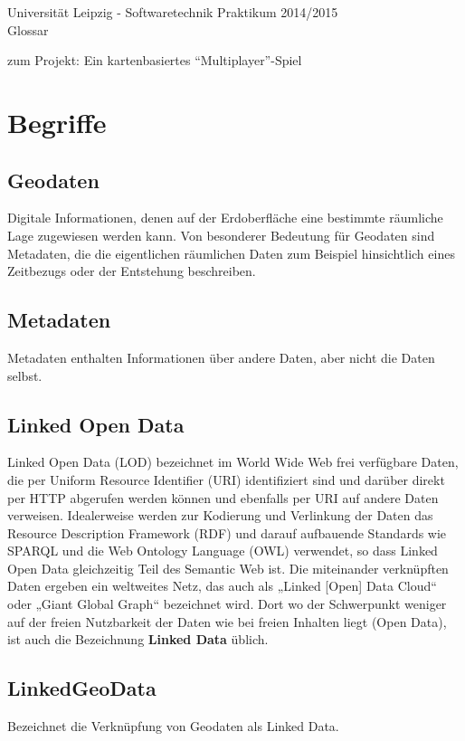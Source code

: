 \documentclass[11pt,a4paper]{article}
\begin{document}
\center \large Universität Leipzig - Softwaretechnik Praktikum 2014/2015\\
\center \Huge Glossar \\
\par\bigskip

\small zum Projekt: Ein kartenbasiertes “Multiplayer”-Spiel

\par\bigskip

\tableofcontents 

\clearpage

\flushleft
\section{Begriffe}
\subsection{Geodaten}  
Digitale Informationen, denen auf der Erdoberfläche eine bestimmte räumliche Lage zugewiesen werden kann. Von besonderer Bedeutung für Geodaten sind Metadaten, die die eigentlichen räumlichen Daten zum Beispiel hinsichtlich eines Zeitbezugs oder der Entstehung beschreiben.
\subsection{Metadaten}
Metadaten enthalten Informationen über andere Daten, aber nicht die Daten selbst.
\subsection{Linked Open Data}
Linked Open Data (LOD) bezeichnet im World Wide Web frei verfügbare Daten, die per Uniform Resource Identifier (URI) identifiziert sind und darüber direkt per HTTP abgerufen werden können und ebenfalls per URI auf andere Daten verweisen. Idealerweise werden zur Kodierung und Verlinkung der Daten das Resource Description Framework (RDF) und darauf aufbauende Standards wie SPARQL und die Web Ontology Language (OWL) verwendet, so dass Linked Open Data gleichzeitig Teil des Semantic Web ist. Die miteinander verknüpften Daten ergeben ein weltweites Netz, das auch als „Linked [Open] Data Cloud“ oder „Giant Global Graph“ bezeichnet wird. Dort wo der Schwerpunkt weniger auf der freien Nutzbarkeit der Daten wie bei freien Inhalten liegt (Open Data), ist auch die Bezeichnung \textbf{Linked Data} üblich.\subsection{LinkedGeoData}
Bezeichnet die Verknüpfung von Geodaten als Linked Data.
\end{document}
